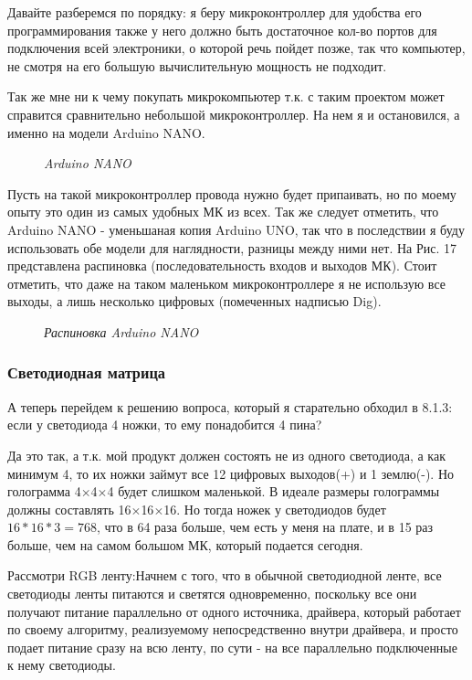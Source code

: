 \documentclass[a4paper, 12pt]{article}
\newcommand{\image}[3]{
	\begin{figure}[ht]
		\center{\texttt{[image: img/\#1]} }
		\caption{\textit{#3}}\end{figure}
}
\begin{document}
Давайте разберемся по порядку: я беру микроконтроллер для удобства его
программирования также у него должно быть достаточное кол-во портов для
подключения всей электроники, о которой речь пойдет позже, так что компьютер,
не смотря на его большую вычислительную мощность не подходит.

Так же мне ни к чему покупать микрокомпьютер т.к. с таким проектом может 
справится сравнительно небольшой микроконтроллер. На нем я и остановился, а 
именно на модели Arduino NANO.

\image{дуня нано2.jpg}{140}{Arduino NANO}

Пусть на такой микроконтроллер провода нужно будет припаивать, но по моему 
опыту это один из самых удобных МК из всех. Так же следует отметить, что 
Arduino NANO - уменьшаная копия Arduino UNO, так что в последствии я буду 
использовать обе модели для наглядности, разницы между ними нет. На Рис. 17 
представлена распиновка (последовательность входов и выходов МК). Стоит 
отметить, что даже на таком маленьком микроконтроллере я не использую все 
выходы, а лишь несколько цифровых (помеченных надписью Dig).

\image{дуня нано.jpg}{150}{Распиновка Arduino NANO}

\subsubsection{Светодиодная матрица}

А теперь перейдем к решению вопроса, который я старательно обходил в 8.1.3:
если у светодиода 4 ножки, то ему понадобится 4 пина?

Да это так, а т.к. мой продукт должен состоять не из одного светодиода, а
как минимум 4, то их ножки займут все 12 цифровых выходов(+) и 1 землю(-).
Но голограмма 4$\times$4$\times$4 будет слишком маленькой. В идеале размеры
голограммы должны составлять 16$\times$16$\times$16. Но тогда ножек у
светодиодов будет $16*16*3=768$, что в 64 раза больше, чем есть у меня на 
плате, и в 15 раз больше, чем на самом большом МК, который подается сегодня.

Рассмотри RGB ленту:Начнем с того, что в обычной светодиодной ленте, все светодиоды ленты
питаются и светятся одновременно, поскольку все они получают питание
параллельно от одного источника, драйвера, который работает по своему алгоритму, реализуемому
непосредственно внутри драйвера, и просто подает питание сразу на всю ленту, по сути - на все
параллельно подключенные к нему светодиоды.
\end{document}

